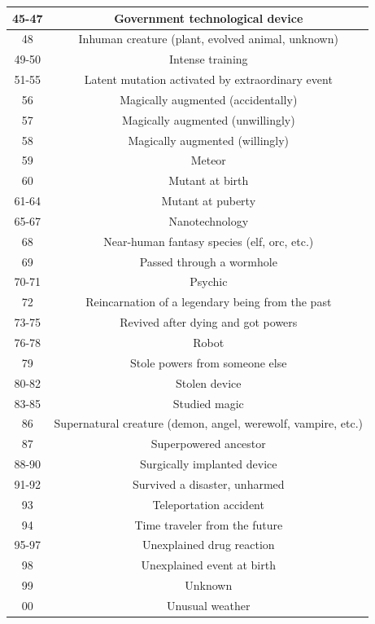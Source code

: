\begin{longtable}{| c | c |}
45-47 & Government technological device \\ \hline
48 & Inhuman creature (plant, evolved animal, unknown)  \\ \hline
49-50 & Intense training \\ \hline
51-55 & Latent mutation activated by extraordinary event  \\ \hline
56 & Magically augmented (accidentally) \\ \hline
57 & Magically augmented (unwillingly) \\ \hline
58 & Magically augmented (willingly) \\ \hline
59 & Meteor \\ \hline
60 & Mutant at birth \\ \hline
61-64 & Mutant at puberty \\ \hline
65-67 & Nanotechnology \\ \hline
68 & Near-human fantasy species (elf, orc, etc.) \\ \hline
69 & Passed through a wormhole \\ \hline
70-71 & Psychic \\ \hline
72 & Reincarnation of a legendary being from the past \\ \hline
73-75 &Revived after dying and got powers \\ \hline
76-78 & Robot \\ \hline
79 & Stole powers from someone else \\ \hline
80-82 & Stolen device \\ \hline
83-85 & Studied magic \\ \hline
86 & Supernatural creature (demon, angel, werewolf, vampire, etc.)  \\ \hline
87 & Superpowered ancestor \\ \hline
88-90 & Surgically implanted device \\ \hline
91-92 & Survived a disaster, unharmed \\ \hline
93 & Teleportation accident \\ \hline
94 & Time traveler from the future \\ \hline
95-97 & Unexplained drug reaction \\ \hline
98 & Unexplained event at birth \\ \hline
99 & Unknown \\ \hline
00 & Unusual weather \\ \hline

\end{longtable}

